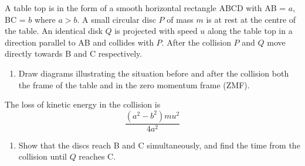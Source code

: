 
\begin{hint}[Discs on a Table]%
{A table top is in the form of a smooth horizontal rectangle ABCD with AB = $a$, BC = $b$ where $a>b$. A small circular disc $P$ of mass $m$ is at rest at the centre of the table. An identical disk $Q$ is projected with speed $u$ along the table top in a direction parallel to AB and collides with $P$. After the collision $P$ and $Q$ move directly towards B and C respectively.
\begin{enumerate}
	\item Draw diagrams illustrating the situation before and after the collision both the frame of the table and in the zero momentum frame (ZMF).
\end{enumerate}
The loss of kinetic energy in the collision is \begin{equation*} \frac{(a^{2} - b^{2}) mu^{2}}{4a^{2}} \end{equation*}
\begin{enumerate}[resume]
	\item Show that the discs reach B and C simultaneously, and find the time from the collision until $Q$ reaches C.
	

\end{enumerate}}
\end{hint}

